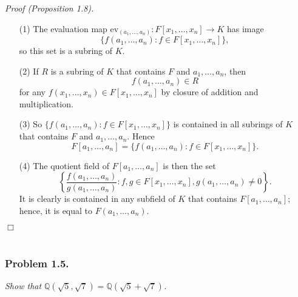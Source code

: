 \documentclass{article}
\begin{document}
\emph{Proof (Proposition 1.8).}
\begin{enumerate}
\item[(1)]
The evaluation map
$\text{ev}_{(a_1, \ldots, a_n)}: F[x_1, \ldots, x_n] \to K$ has image
$$\{ f(a_1, \ldots, a_n) : f \in F[x_1, \ldots, x_n] \},$$
so this set is a subring of $K$.
\item[(2)]
If $R$ is a subring of $K$ that contains $F$ and $a_1, \ldots, a_n$,
then $$f(a_1, \ldots, a_n) \in R$$ for any $f(x_1, \ldots, x_n) \in F[x_1, \ldots, x_n]$
by closure of addition and multiplication.
\item[(3)]
So
$\{ f(a_1, \ldots, a_n) : f \in F[x_1, \ldots, x_n] \}$ is contained in all subrings
of $K$ that contains $F$ and $a_1, \ldots, a_n$.
Hence
$$F[a_1, \ldots, a_n] = \{ f(a_1, \ldots, a_n) : f \in F[x_1, \ldots, x_n] \}.$$
\item[(4)]
The quotient field of $F[a_1, \ldots, a_n]$ is then the set
$$\left\{
\frac{f(a_1, \ldots, a_n)}{g(a_1, \ldots, a_n)} : f, g \in F[x_1, \ldots, x_n],
g(a_1, \ldots, a_n) \neq 0
\right\}.$$
It is clearly is contained in any subfield of $K$ that contains $F[a_1, \ldots, a_n]$;
hence, it is equal to $F(a_1, \ldots, a_n)$.
\end{enumerate}
$\Box$ \\\\






\subsubsection*{Problem 1.5.}
\emph{Show that 
$\mathbb{Q}(\sqrt{5}, \sqrt{7}) = \mathbb{Q}(\sqrt{5} + \sqrt{7})$.} \\
\end{document}
